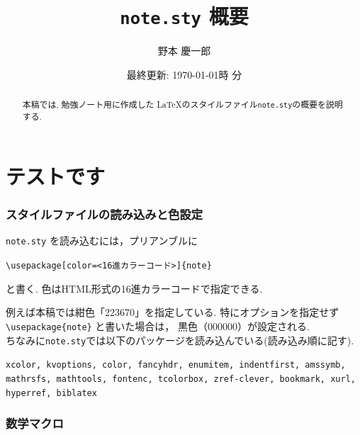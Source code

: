 \documentclass[
	paper=a4,
	fontsize=10pt, %
	jafontsize=12Q,
	jafontscale=0.92,
]{jlreq}
\title{\texttt{note.sty} 概要}
\author{野本 慶一郎}
\date{最終更新: \today \texthours 時 \textminutes 分 \clocktime}
\begin{document}
\maketitle
\newpage


\begin{abstract}
	本稿では, 勉強ノート用に作成した \LaTeX のスタイルファイル\texttt{note.sty}の概要を説明する.
	\lipsum[1-2]
\end{abstract}

\tableofcontents
\newpage

\part{テストです}

\section{スタイルファイルの読み込みと色設定}

\texttt{note.sty} を読み込むには，プリアンブルに
\begin{center}
  \verb|\usepackage[color=<16進カラーコード>]{note}|
\end{center}
と書く. 色はHTML形式の16進カラーコードで指定できる.

例えば本稿では紺色「223670」を指定している.
特にオプションを指定せず \verb|\usepackage{note}| と書いた場合は，
黒色（000000）が設定される.
\\

ちなみに\texttt{note.sty}では以下のパッケージを読み込んでいる(読み込み順に記す).
\begin{center}
	\texttt{xcolor, kvoptions, color, fancyhdr, enumitem, indentfirst, amssymb, mathrsfs, mathtools, fontenc, tcolorbox, zref-clever, bookmark, xurl, hyperref, biblatex}
\end{center}

\section{数学マクロ}
\end{document}
